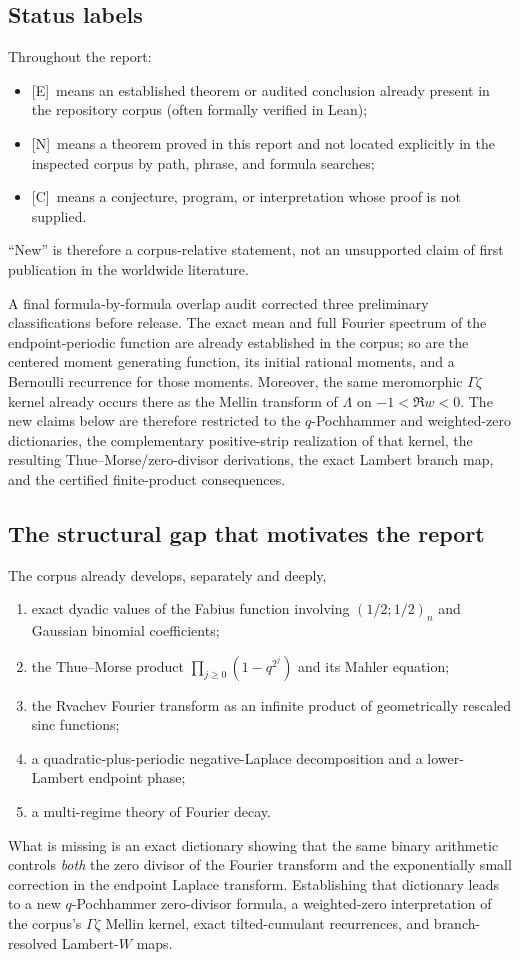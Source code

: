 \documentclass[11pt,oneside]{article}
\theoremstyle{definition}
\theoremstyle{remark}
\newcommand{\statusE}{\textsf{[E]}}
\newcommand{\statusN}{\textsf{[N]}}
\newcommand{\statusC}{\textsf{[C]}}
\begin{document}
\subsection{Status labels}
Throughout the report:
\begin{itemize}
\item \statusE\ means an established theorem or audited conclusion already present in the
repository corpus (often formally verified in Lean);
\item \statusN\ means a theorem proved in this report and not located explicitly in the
inspected corpus by path, phrase, and formula searches;
\item \statusC\ means a conjecture, program, or interpretation whose proof is not supplied.
\end{itemize}
``New'' is therefore a corpus-relative statement, not an unsupported claim of first
publication in the worldwide literature.

A final formula-by-formula overlap audit corrected three preliminary classifications before
release.  The exact mean and full Fourier spectrum of the endpoint-periodic function are
already established in the corpus; so are the centered moment generating function, its
initial rational moments, and a Bernoulli recurrence for those moments.  Moreover, the
same meromorphic $\Gamma\zeta$ kernel already occurs there as the Mellin transform of
$\Lambda$ on $-1<\Re w<0$.  The new claims below are therefore restricted to the
$q$-Pochhammer and weighted-zero dictionaries, the complementary positive-strip
realization of that kernel, the resulting Thue--Morse/zero-divisor derivations, the exact
Lambert branch map, and the certified finite-product consequences.

\subsection{The structural gap that motivates the report}
The corpus already develops, separately and deeply,
\begin{enumerate}
\item exact dyadic values of the Fabius function involving $(1/2;1/2)_n$ and Gaussian
binomial coefficients;
\item the Thue--Morse product $\prod_{j\ge0}(1-q^{2^j})$ and its Mahler equation;
\item the Rvachev Fourier transform as an infinite product of geometrically rescaled sinc
functions;
\item a quadratic-plus-periodic negative-Laplace decomposition and a lower-Lambert endpoint
phase;
\item a multi-regime theory of Fourier decay.
\end{enumerate}
What is missing is an exact dictionary showing that the same binary arithmetic controls
\emph{both} the zero divisor of the Fourier transform and the exponentially small correction
in the endpoint Laplace transform.  Establishing that dictionary leads to a new
$q$-Pochhammer zero-divisor formula, a weighted-zero interpretation of the corpus's
$\Gamma\zeta$ Mellin kernel, exact tilted-cumulant recurrences, and branch-resolved
Lambert-$W$ maps.
\end{document}
